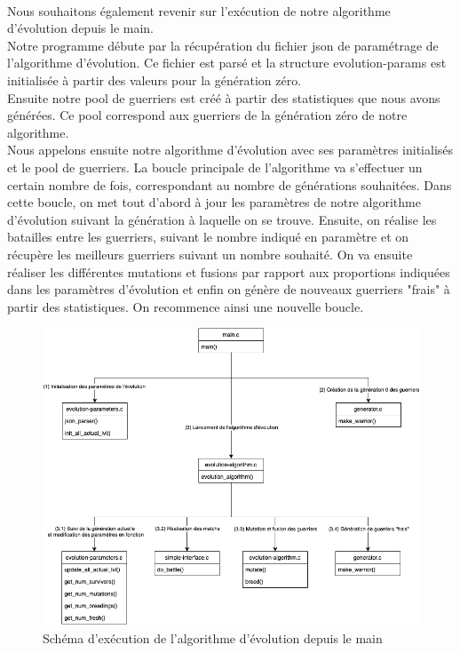\documentclass[french]{article}
\begin{document}
        \newpage
        \paragraph{} Nous souhaitons également revenir sur l'exécution de notre algorithme d'évolution depuis le main. \\
        Notre programme débute par la récupération du fichier json de paramétrage de l'algorithme d'évolution. Ce fichier est parsé et la structure evolution-params est initialisée à partir des valeurs pour la génération zéro. \\ 
        Ensuite notre pool de guerriers est créé à partir des statistiques que nous avons générées. Ce pool correspond aux guerriers de la génération zéro de notre algorithme. \\ 
        Nous appelons ensuite notre algorithme d'évolution avec ses paramètres initialisés et le pool de guerriers. La boucle principale de l'algorithme va s'effectuer un certain nombre de fois, correspondant au nombre de générations souhaitées. Dans cette boucle, on met tout d'abord à jour les paramètres de notre algorithme d'évolution suivant la génération à laquelle on se trouve. Ensuite, on réalise les batailles entre les guerriers,  suivant le nombre indiqué en paramètre et on récupère les meilleurs guerriers suivant un nombre souhaité. On va ensuite réaliser les différentes mutations et fusions par rapport aux proportions indiquées dans les paramètres d'évolution et enfin on génère de nouveaux guerriers "frais" à partir des statistiques. On recommence ainsi une nouvelle boucle. 
        \begin{figure}[!ht]
            \centering \includegraphics[scale=0.6]{image/mainAlgo.png}
            \caption{Schéma d'exécution de l'algorithme d'évolution depuis le main}
        \end{figure}
\end{document}
